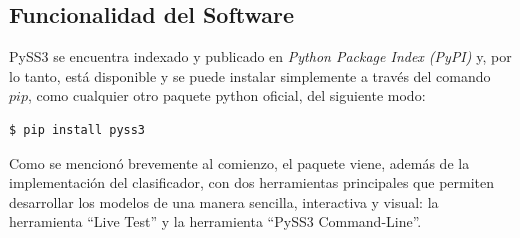 \subsection{Funcionalidad del Software}
\label{sec:soft-func}

PySS3 se encuentra indexado y publicado en \emph{Python Package Index (PyPI)} y, por lo tanto, está disponible y se puede instalar simplemente a través del comando $pip$, como cualquier otro paquete python oficial, del siguiente modo: %

\begin{verbatim}
$ pip install pyss3
\end{verbatim}

Como se mencionó brevemente al comienzo, el paquete viene, además de la implementación del clasificador, con dos herramientas principales que permiten desarrollar los modelos de una manera sencilla, interactiva y visual: la herramienta ``Live Test'' y la herramienta ``PySS3 Command-Line''.

\

